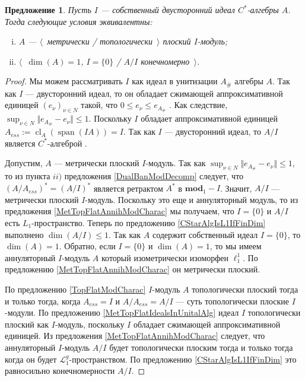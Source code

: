 \documentclass[12pt]{article}
\newtheorem{proposition}[theorem]{Предложение}
\begin{document}
\begin{proposition}\label{CStarAlgIsTopFlatOverItsIdeal} Пусть $I$ --- собственный двусторонний идеал $C^*$-алгебры $A$. Тогда следующие условия эквивалентны:
\begin{enumerate}[i)]
\item $A$ --- $\langle$~метрически / топологически~$\rangle$ плоский $I$-модуль;
\item $\langle$~$\operatorname{dim}(A)=1$, $I=\{0\}$ / $A/I$ конечномерно~$\rangle$.
\end{enumerate}
\end{proposition}
\begin{proof} Мы можем рассматривать $I$ как идеал в унитизации $A_\#$ алгебры $A$. Так как $I$ --- двусторонний идеал, то он обладает сжимающей аппроксимативной единицей $(e_\nu)_{\nu\in N}$ такой, что $0\leq e_\nu\leq e_{A_\#}$ \cite[предложение 4.7.79]{HelBanLocConvAlg}. Как следствие, $\sup_{\nu\in N}\Vert e_{A_\#}-e_\nu\Vert\leq 1$. Поскольку $I$ обладает аппроксимативной единицей $A_{ess}:=\operatorname{cl}_A(\operatorname{span}(IA))=I$. Так как $I$ --- двусторонний идеал, то $A/I$ является $C^*$-алгеброй \cite[теорема 4.7.81]{HelBanLocConvAlg}.

Допустим, $A$ --- метрически плоский $I$-модуль. Так как $\sup_{\nu\in N}\Vert e_{A_\#}-e_\nu\Vert\leq 1$, то из пункта $ii)$ предложения \ref{DualBanModDecomp} следует, что $(A/A_{ess})^*=(A/I)^*$ является ретрактом $A^*$ в $\mathbf{mod}_1-I$. Значит, $A/I$ --- метрически плоский $I$-модуль. Поскольку это еще и аннуляторный модуль, то из предложения \ref{MetTopFlatAnnihModCharac} мы получаем, что $I=\{0\}$ и $A/I$ есть $L_1$-пространство. Теперь по предложению \ref{CStarAlgIsL1IfFinDim} выполнено $\operatorname{dim}(A/I)\leq 1$. Так как $A$ содержит собственный идеал $I=\{0\}$, то $\operatorname{dim}(A)=1$. Обратно, если $I=\{0\}$ и $\operatorname{dim}(A)=1$, то мы имеем аннуляторный $I$-модуль $A$ который изометрически изоморфен $\ell_1^1$. По предложению \ref{MetTopFlatAnnihModCharac} он метрически плоский. 

По предложению \ref{TopFlatModCharac} $I$-модуль $A$ топологически плоский тогда и только тогда, когда $A_{ess}=I$ и $A/A_{ess}=A/I$ --- суть топологически плоские $I$-модули. По предложению \ref{MetTopFlatIdealsInUnitalAlg} идеал $I$ топологически плоский как $I$-модуль, поскольку $I$ обладает сжимающей аппроксимативной единицей. Из предложения \ref{MetTopFlatAnnihModCharac} следует, что аннуляторный $I$-модуль $A/I$ будет топологически плоским тогда и только тогда когда он будет $\mathcal{L}_1^g$-пространством. По предложению \ref{CStarAlgIsL1IfFinDim} это равносильно конечномерности $A/I$.
\end{proof}
\end{document}
